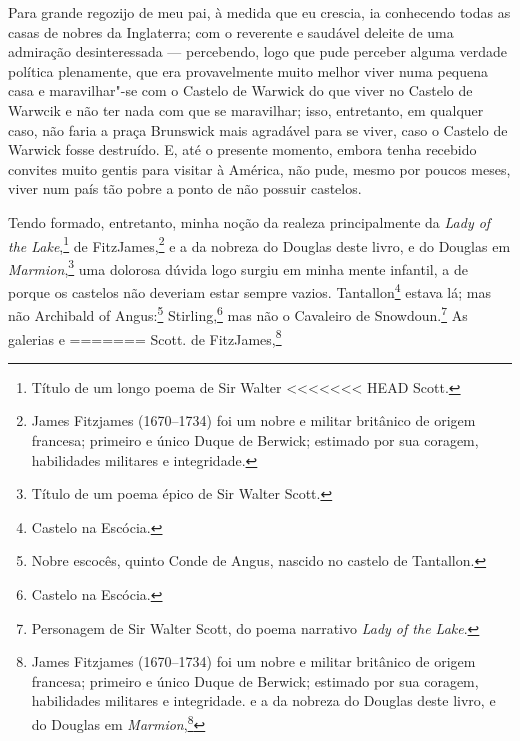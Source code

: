 {{{{%
Para grande regozijo de meu pai, à medida que eu crescia, ia
conhecendo todas as casas de nobres da Inglaterra; com o reverente e
saudável deleite de uma admiração desinteressada --- percebendo, logo que
pude perceber alguma verdade política plenamente, que era provavelmente
muito melhor viver numa pequena casa e maravilhar"-se com o Castelo de
Warwick do que viver no Castelo de Warwcik e não ter nada com que se
maravilhar; isso, entretanto, em qualquer caso, não faria a praça
Brunswick mais agradável para se viver, caso o Castelo de Warwick fosse
destruído. E, até o presente momento, embora tenha recebido convites
muito gentis para visitar à América, não pude, mesmo por poucos meses,
viver num país tão pobre a ponto de não possuir castelos.

Tendo formado, entretanto, minha noção da realeza principalmente da
\textit{Lady of the Lake},\footnote{Título de um longo poema de Sir Walter
<<<<<<< HEAD
  Scott.} de FitzJames,\footnote{James Fitzjames
  (1670--1734) foi um nobre e militar britânico de origem francesa; primeiro e único Duque de Berwick; estimado por sua coragem, habilidades militares e
  integridade.} e a da nobreza do Douglas deste livro, e
do Douglas em \textit{Marmion},\footnote{Título de um poema épico de Sir
  Walter Scott.} uma dolorosa dúvida logo surgiu
em minha mente infantil, a de porque os castelos não deveriam estar
sempre vazios. Tantallon\footnote{Castelo na Escócia.}
estava lá; mas não Archibald of Angus:\footnote{Nobre escocês, quinto Conde
  de Angus, nascido no castelo de Tantallon.}
Stirling,\footnote{Castelo na Escócia.} mas não o
Cavaleiro de Snowdoun.\footnote{Personagem de Sir Walter Scott, do poema
  narrativo \textit{Lady of the Lake}.} As galerias e
=======
  Scott.  de FitzJames,\footnote{James Fitzjames
  (1670--1734) foi um nobre e militar britânico de origem francesa; primeiro e único Duque de Berwick; estimado por sua coragem, habilidades militares e
  integridade.  e a da nobreza do Douglas deste livro, e
do Douglas em \textit{Marmion},\footnote{Título de um poema épico de Sir
  Walter Scott.  uma dolorosa dúvida logo surgiu
em minha mente infantil, a de porque os castelos não deveriam estar
sempre vazios. Tantallon\footnote{Castelo na Escócia. 
estava lá; mas não Archibald of Angus:\footnote{Nobre escocês, quinto Conde
  de Angus, nascido no castelo de Tantallon. 
Stirling,\footnote{Castelo na Escócia.  mas não o
Cavaleiro de Snowdoun.\footnote{Personagem de Sir Walter Scott, do poema
  narrativo \textit{Lady of the Lake}.  As galerias e
>>>>>>> 7ef31cc2a6d5603f856fee4c85bc83700040648c
}}}}}}}}}}
